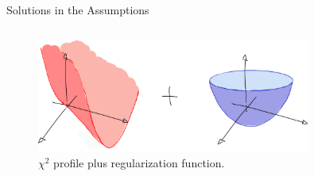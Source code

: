 \documentclass[9pt]{beamer}
\begin{document}
\begin{frame}{Solutions in the Assumptions}
\begin{columns}
\begin{column}{0.5\textwidth}
            \begin{figure}
                \centering
                \includegraphics[width=0.8\textwidth]{regularized}
                \caption{$\chi^2$ profile plus regularization function.}
            \end{figure}
        \end{column}
    \end{columns}
\end{frame}
\end{document}

